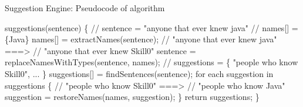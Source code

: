 \begin{frame}[fragile]{Suggestion Engine: Pseudocode of algorithm}\pause
\begin{semiverbatim}\small
suggestions(sentence) \{
    \textcolor{Comment}{// sentence = "anyone that ever knew java"
    // names[] = \{Java\}}
    names[] = extractNames(sentence);\pause
    \vspace{-2mm} \textcolor{Comment}{
    // "anyone that ever knew java" ===> 
    // "anyone that ever knew Skill0"}
    sentence = replaceNamesWithTypes(sentence, names); \pause
    \vspace{-2mm}\textcolor{Comment}{
    // suggestions = \{ "people who know Skill0", ... \} }
    suggestions[] = findSentences(sentence);\pause
    \vspace{-2mm}
    for each suggestion in suggestions \{ \textcolor{Comment}{
    // "people who know Skill0" ===> 
    // "people who know Java"}
      suggestion = restoreNames(names, suggestion);
    \}
    return suggestions; 
\}
\end{semiverbatim}
\end{frame}